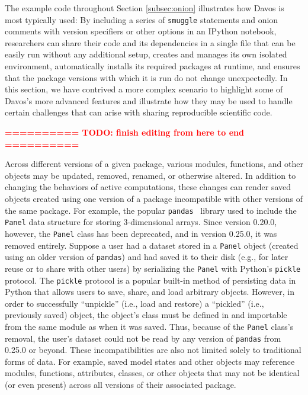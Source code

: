 \documentclass[preprint,12pt,a4paper]{elsarticle}
\begin{document}
The example code throughout Section \ref{subsec:onion} illustrates how Davos is most typically used:
By including a series of \texttt{smuggle} statements and onion comments with version specifiers or other options in an IPython notebook, researchers can share their code and its dependencies in a single file that can be easily run without any additional setup, creates and manages its own isolated environment, automatically installs its required packages at runtime, and ensures that the package versions with which it is run do not change unexpectedly.
In this section, we have contrived a more complex scenario to highlight some of Davos's more advanced features and illustrate how they may be used to handle certain challenges that can arise with sharing reproducible scientific code.

\bigskip\bigskip\textcolor{red}{\textbf{========== TODO: finish editing from here to end ==========}}\bigskip\bigskip

Across different versions of a given package, various modules, functions,
and other objects may be updated, removed, renamed, or otherwise altered. In
addition to changing the behaviors of active computations, these changes can
render saved objects created using one version of a package incompatible with
other versions of the same package. For example, the popular
\texttt{pandas}~\cite{McKi10} library used to include the \texttt{Panel} data
structure for storing 3-dimensional arrays. Since version 0.20.0, however, the
\texttt{Panel} class has been deprecated, and in version 0.25.0, it was removed
entirely. Suppose a user had a dataset stored in a \texttt{Panel} object
(created using an older version of \texttt{pandas}) and had saved it to their
disk (e.g., for later reuse or to share with other users) by serializing the
\texttt{Panel} with Python's \texttt{pickle} protocol. The \texttt{pickle}
protocol is a popular built-in method of persisting data in Python that allows
users to save, share, and load arbitrary objects. However, in order to
successfully ``unpickle'' (i.e., load and restore) a ``pickled'' (i.e., previously saved)
object, the object's class must be defined in and importable from the same
module as when it was saved. Thus, because of the \texttt{Panel} class's
removal, the user's dataset could not be read by any version of \texttt{pandas}
from 0.25.0 or beyond. These incompatibilities are also not limited solely to
traditional forms of data. For example, saved model states and other objects
may reference modules, functions, attributes, classes, or other objects that
may not be identical (or even present) across all versions of their associated
package.
\end{document}
